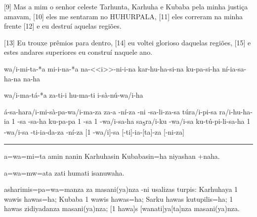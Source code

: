 [9] Mas a mim o senhor celeste Tarhunta, Karhuha e Kubaba pela minha justiça
amavam,
[10] eles me sentaram no HUHURPALA,
[11] eles correram na minha frente
	[12] e eu destruí aquelas regiões.

[13] Eu trouxe prêmios para dentro,
[14] eu voltei glorioso daquelas regiões,
[15] e estes andares superiores eu construí naquele ano.



\setcounter{parcount}{15}
\begin{parnumbersa}[]

	\raggedright%
	\itshape%


	wa/i-mi-ta-*a mi-i-na-*a na-<<i>>-ni-i-na kar-hu-ha-si-na ku-pa-si-ha ní-ia-sa-ha-na \lmasc{}na-ha

	wa/i-ma-tá-*a \lmasc{}za\lbreak{}-ti-i \lmasc{}hu-ma-ti \lmasc{}i-sà-nú-wa/i-ha

	á-sa-ha\logo{+}ra/i-mi-sà-pa-wa/i-ma-za \lmasc{}za-a -ní-za
	\lmasc{}-ni -sa-li-za-sa
	\lmasc{}tú\logo{+}ra/i-pi-sa
	ra/i-hu-ha-ia 1
	-sa -sa-ha
	ku-pa-pa 1 -sa 1
	-wa/i-sa-ha
	sa\textsubscript{5}\logo{+}ra/i-ku -wa/i-sa ku-tú-pi-li-sa-ha 1 -wa/i-sa \lmasc{}-ti-ia-da-za -ní-za \lbreak{} $[$1 -wa/i$]$-sa $[$-ti$]$-ia-$[$ta$]$-za $[$-ni-za$]$


\end{parnumbersa}

\vspace{10pt}
\hrule
\vspace{10pt}


\setcounter{parcount}{15}
\begin{parnumbersa}[]

	\raggedright%
	\itshape%


	a=wa=mi=ta amin nanin Karhuhasin Kubabasin=ha niyashan +naha.

	a=wa=mw=ata zati humati isanuwaha.

	asharimis=pa=wa=manza za masani{(ya)}nza -ni usalizas turpis:
	Karhuhaya 1 wawis hawas=ha;
	Kubaba 1 wawis hawas=ha;
	Sarku hawas kutupilis=ha;
	1 hawas zidiyadanza masani{(ya)}nza; $[$1 hawa$]$s $[$wanati$]$ya$[$ta$]$nza
	masani{(ya)}nza.


\end{parnumbersa}


